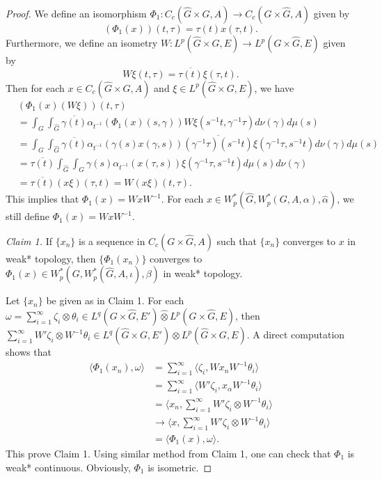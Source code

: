 \documentclass[reqno,11pt]{amsart}
\theoremstyle{plain}
\theoremstyle{definition}
\theoremstyle{remark}
\newcommand{\la}{\langle}
\newcommand{\ra}{\rangle}
\begin{document}
\begin{proof}
We define an isomorphism $\Phi_1:C_c(\hat{G}\times G,A)\rightarrow C_c(G\times \hat{G},A)$ given by $$\left(\Phi_1(x)\right)(t,\tau)=\tau(t)x(\tau,t).$$
Furthermore, we define an isometry $W:L^p(\hat{G}\times G,E)\rightarrow L^p(G\times \hat{G},E)$ given by $$W\xi(t,\tau)=\overline{\tau(t)}\xi(\tau,t).$$
Then for each $x\in C_c(\hat{G}\times G,A)$ and $\xi\in L^p(\hat{G}\times G,E)$, we have
$$\begin{aligned} &\left(\Phi_1(x)(W\xi)\right)(t,\tau)\\
&= \int_{G}\int_{\hat{G}} \overline{\gamma(t)}\alpha_{t^{-1}}(\Phi_1(x)(s,\gamma))W\xi(s^{-1}t,\gamma^{-1}\tau)d\nu(\gamma)d\mu(s)
  \\ &=\int_{G}\int_{\hat{G}}
  \overline{\gamma(t)}\alpha_{t^{-1}}(\gamma(s)x(\gamma,s))\overline{(\gamma^{-1}\tau)(s^{-1}t)}\xi(\gamma^{-1}\tau,s^{-1}t)d\nu(\gamma)d\mu(s)
\\&=\overline{\tau(t)}\int_{\hat{G}}\int_{G} \gamma(s)\alpha_{t^{-1}}(x(\tau,s))\xi(\gamma^{-1}\tau,s^{-1}t)d\mu(s)d\nu(\gamma)
\\&=\overline{\tau(t)}(x\xi)(\tau,t)=W(x\xi)(t,\tau).
\end{aligned}$$
This implies that $\Phi_1(x)=WxW^{-1}.$
For each $x\in W^*_p(\hat{G},W^*_p(G,A,\alpha),\hat{\alpha})$, we still define $\Phi_1(x)=WxW^{-1}.$

{\it Claim 1.} If $\{x_n\}$ is a sequence in $C_c(G\times\hat{G},A)$ such that $\{x_n\}$ converges to $x$ in weak* topology, then $\{\Phi_1(x_n)\}$ converges to $\Phi_1(x)\in W^*_p(G,W^*_p(\hat{G},A,\iota),\beta)$ in weak* topology.

Let $\{x_n\}$ be given as in Claim 1.
For each $\omega=\sum_{i=1}^\infty \zeta_i\otimes \theta_i\in L^q(G\times\hat{G},E')\widehat{\otimes}L^p(G\times\hat{G},E)$, then $\sum_{i=1}^\infty W'\zeta_i\otimes W^{-1}\theta_i\in L^q(\hat{G}\times G,E')\widehat{\otimes}L^p(\hat{G}\times G,E)$.
A direct computation shows that $$\begin{aligned} \la \Phi_1(x_n),\omega \ra&=
\sum_{i=1}^\infty \la \zeta_i, Wx_n W^{-1} \theta_i\ra
  \\ &=\sum_{i=1}^\infty\la W'\zeta_i,x_\alpha W^{-1} \theta_i\ra
\\&=\la x_n, \sum_{i=1}^\infty W'\zeta_i\otimes W^{-1}\theta_i\ra
\\&\rightarrow \la x, \sum_{i=1}^\infty W'\zeta_i\otimes W^{-1}\theta_i\ra
\\&=\la \Phi_1(x),\omega\ra .
\end{aligned}$$
This prove Claim 1.
Using similar method from Claim 1, one can check that $\Phi_1$ is weak* continuous. Obviously, $\Phi_1$ is isometric.
\end{proof}
\end{document}
